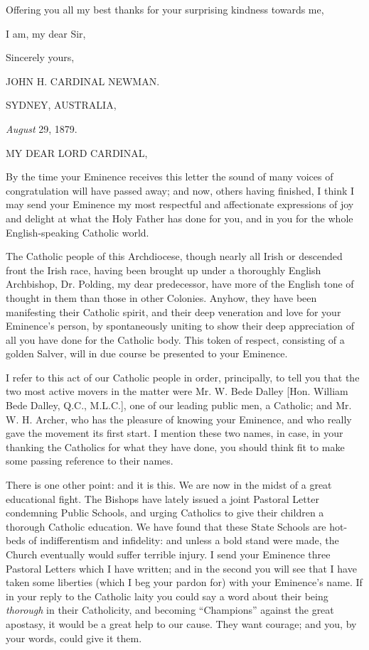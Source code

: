 Offering you all my best thanks for your surprising kindness
towards me,

I am, my dear Sir,

Sincerely yours,

JOHN H. CARDINAL NEWMAN.


SYDNEY, AUSTRALIA,

\emph{August} 29, 1879.

MY DEAR LORD
CARDINAL,

By the time your Eminence receives this letter the sound of many
voices of congratulation will have passed away; and now, others having
finished, I think I may send your Eminence my most respectful and
affectionate expressions of joy and delight at what the Holy Father
has done for you, and in you for the whole English-speaking Catholic
world.

The Catholic people of this Archdiocese, though nearly all Irish or
descended front the Irish race, having been brought up under a
thoroughly English Archbishop, Dr. Polding, my dear predecessor, have
more of the English tone of thought in them than those in other
Colonies. Anyhow, they have been manifesting their Catholic spirit,
and their deep veneration and love for your Eminence's person, by
spontaneously uniting to show their deep appreciation of all you have
done for the Catholic body. This token of respect, consisting of a
golden Salver, will in due course be presented to your Eminence.

I refer to this act of our Catholic people in order, principally,
to tell you that the two most active movers in the matter were Mr. W.
Bede Dalley [Hon. William Bede Dalley, Q.C., M.L.C.], one of our
leading public men, a Catholic; and Mr. W. H. Archer, who has the
pleasure of knowing your Eminence, and who really gave the movement
its first start. I mention these two names, in case, in your thanking
the Catholics for what they have done, you should think fit to make
some passing reference to their names.

There is one other point: and it is this. We are now in the midst
of a great educational fight. The Bishops have lately issued a joint
Pastoral Letter condemning Public Schools, and urging Catholics to
give their children a thorough Catholic education. We have found that
these State Schools are hot-beds of indifferentism and infidelity: and
unless a bold stand were made, the Church eventually would suffer
terrible injury. I send your Eminence three Pastoral Letters which I
have written; and in the second you will see that I have taken some
liberties (which I beg your pardon for) with your Eminence's name. If
in your reply to the Catholic laity you could say a word about their
being \emph{thorough} in their Catholicity, and becoming
``Champions'' against the great apostasy, it would be a great
help to our cause. They want courage; and you, by your words, could
give it them.

